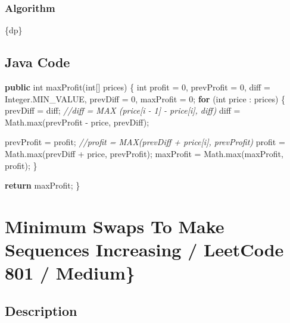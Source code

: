 \documentclass[]{book}
\newenvironment{Shaded}{\begin{snugshade}}{\end{snugshade}}
\newcommand{\BuiltInTok}[1]{#1}
\newcommand{\CommentTok}[1]{\textcolor[rgb]{0.56,0.35,0.01}{\textit{#1}}}
\newcommand{\DataTypeTok}[1]{\textcolor[rgb]{0.13,0.29,0.53}{#1}}
\newcommand{\DecValTok}[1]{\textcolor[rgb]{0.00,0.00,0.81}{#1}}
\newcommand{\FunctionTok}[1]{\textcolor[rgb]{0.00,0.00,0.00}{#1}}
\newcommand{\KeywordTok}[1]{\textcolor[rgb]{0.13,0.29,0.53}{\textbf{#1}}}
\newcommand{\NormalTok}[1]{#1}
\begin{document}
\hypertarget{algorithm-37}{%
\subsubsection{Algorithm}\label{algorithm-37}}

\{dp\}

\hypertarget{java-code-31}{%
\subsection{Java Code}\label{java-code-31}}

\begin{Shaded}
\begin{Highlighting}[]
\KeywordTok{public} \DataTypeTok{int} \FunctionTok{maxProfit}\NormalTok{(}\DataTypeTok{int}\NormalTok{[] prices) \{}
    \DataTypeTok{int}\NormalTok{ profit = }\DecValTok{0}\NormalTok{, prevProfit = }\DecValTok{0}\NormalTok{, diff = }\BuiltInTok{Integer}\NormalTok{.}\FunctionTok{MIN_VALUE}\NormalTok{, prevDiff = }\DecValTok{0}\NormalTok{, maxProfit = }\DecValTok{0}\NormalTok{;}
    \KeywordTok{for}\NormalTok{ (}\DataTypeTok{int}\NormalTok{ price : prices) \{}
\NormalTok{        prevDiff = diff;}
        \CommentTok{//diff = MAX (price[i - 1] - price[i], diff)}
\NormalTok{        diff = }\BuiltInTok{Math}\NormalTok{.}\FunctionTok{max}\NormalTok{(prevProfit - price, prevDiff);}

\NormalTok{        prevProfit = profit;}
        \CommentTok{//profit = MAX(prevDiff + price[i], prevProfit)}
\NormalTok{        profit = }\BuiltInTok{Math}\NormalTok{.}\FunctionTok{max}\NormalTok{(prevDiff + price, prevProfit);}
\NormalTok{        maxProfit = }\BuiltInTok{Math}\NormalTok{.}\FunctionTok{max}\NormalTok{(maxProfit, profit);}
\NormalTok{    \}}

    \KeywordTok{return}\NormalTok{ maxProfit;}
\NormalTok{\}}
\end{Highlighting}
\end{Shaded}

\hypertarget{minimum-swaps-to-make-sequences-increasing-leetcode-801-medium}{%
\section{Minimum Swaps To Make Sequences Increasing / LeetCode 801 / Medium\}}\label{minimum-swaps-to-make-sequences-increasing-leetcode-801-medium}}

\hypertarget{description-36}{%
\subsection{Description}\label{description-36}}
\end{document}
